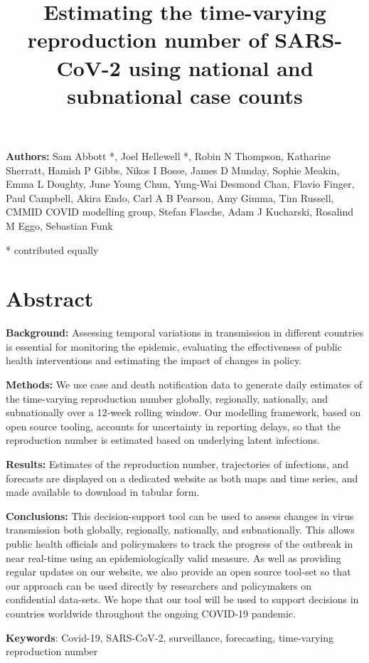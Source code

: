 \documentclass[
]{article}
\title{Estimating the time-varying reproduction number of SARS-CoV-2
using national and subnational case counts}
\author{}
\date{\vspace{-2.5em}}
\begin{document}
\maketitle

\textbf{Authors:} Sam Abbott *, Joel Hellewell *, Robin N Thompson,
Katharine Sherratt, Hamish P Gibbs, Nikos I Bosse, James D Munday,
Sophie Meakin, Emma L Doughty, June Young Chun, Yung-Wai Desmond Chan,
Flavio Finger, Paul Campbell, Akira Endo, Carl A B Pearson, Amy Gimma,
Tim Russell, CMMID COVID modelling group, Stefan Flasche, Adam J
Kucharski, Rosalind M Eggo, Sebastian Funk

* contributed equally

\hypertarget{abstract}{%
\section{Abstract}\label{abstract}}

\textbf{Background:} Assessing temporal variations in transmission in
different countries is essential for monitoring the epidemic, evaluating
the effectiveness of public health interventions and estimating the
impact of changes in policy.

\textbf{Methods:} We use case and death notification data to generate
daily estimates of the time-varying reproduction number globally,
regionally, nationally, and subnationally over a 12-week rolling window.
Our modelling framework, based on open source tooling, accounts for
uncertainty in reporting delays, so that the reproduction number is
estimated based on underlying latent infections.

\textbf{Results:} Estimates of the reproduction number, trajectories of
infections, and forecasts are displayed on a dedicated website as both
maps and time series, and made available to download in tabular form.

\textbf{Conclusions:} This decision-support tool can be used to assess
changes in virus transmission both globally, regionally, nationally, and
subnationally. This allows public health officials and policymakers to
track the progress of the outbreak in near real-time using an
epidemiologically valid measure. As well as providing regular updates on
our website, we also provide an open source tool-set so that our
approach can be used directly by researchers and policymakers on
confidential data-sets. We hope that our tool will be used to support
decisions in countries worldwide throughout the ongoing COVID-19
pandemic.

\textbf{Keywords}: Covid-19, SARS-CoV-2, surveillance, forecasting,
time-varying reproduction number
\end{document}

